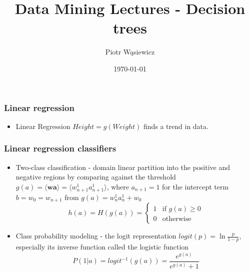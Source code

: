 \documentclass[proffesionalfonts]{beamer}
\title[EARIN]{Data Mining Lectures - Decision trees}
\author{Piotr Wąsiewicz}
\institute[ICS PW]
{
Institute of Computer Science\\
\medskip
{\emph{pwasiewi@elka.pw.edu.pl}}
}
\date{\today}
\begin{document}
\lstset{language=R}



\loadedtable

\begin{frame}
\frametitle{Linear regression}
\begin{block}{}
\begin{itemize}
\item[\ ] Linear Regression $Height=g(Weight)$ finds a trend in data.
\end{itemize}
\end{block}
\end{frame}

\begin{frame}
\frametitle{Linear regression classifiers}
\begin{itemize}
\item Two-class classification - domain linear partition into the positive and negative regions by comparing against the threshold $g(a)=\langle \mathbf w \mathbf a \rangle = \langle w_{n+1}^1 a_{n+1}^1\rangle$, where $a_{n+1}=1$ for the intercept term $b=w_0=w_{n+1}$ from $g(a)=w_n^1a_n^1+w_0$
\[
h(a) = H(g(a)) = \left\{\begin{matrix} 1  & \text{if\ } g(a) \geq 0 \\ 0 & \text{otherwise} \end{matrix}\right.
\]
\item Class probability modeling - the logit representation $logit(p)=\ln{\frac{p}{1-p}}$, especially its inverse function called the logistic function
\[
P(1|a)=logit^{-1}(g(a))=\frac{e^{g(a)}}{e^{g(a)}+1}
\]
\end{itemize}
\end{frame}
\end{document}
